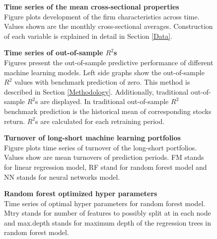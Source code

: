 \documentclass{article}
\begin{document}
\begin{figure}[ht]
\centering
\caption[Time series of the mean cross-sectional properties]{\textbf{Time series of the mean cross-sectional properties}\\ Figure plots development of the firm characteristics across time. Values shown are the monthly cross-sectional averages. Construction of each variable is explained in detail in Section \ref{Data}.}

\label{plot:variableTS}
\end{figure}

\begin{figure}[ht]
\centering
\caption[Time series of out-of-sample $R^2$]{\textbf{Time series of out-of-sample \boldmath$R^2$s}\\ Figures present the out-of-sample predictive performance of different machine learning models. Left side graphs show the out-of-sample $R^2$ values with benchmark prediction of zero. This method is described in Section \ref{Methodology}. Additionally, traditional out-of-sample $R^2$s are displayed. In traditional out-of-sample $R^2$ benchmark prediction is the historical mean of corresponding stocks return. $R^2$s are calculated for each retraining period.}

\label{plot:OOSR2_ts}
\end{figure}

\begin{figure}[ht]
\centering
\caption[Turnover of long-short machine learning portfolios]{\textbf{Turnover of long-short machine learning portfolios}\\ Figure plots time series of turnover of the long-short portfolios. Values show are mean turnovers of prediction periods. FM stands for linear regression model, RF stand for random forest model and NN stands for neural networks model. }

\label{plot:Turnover}
\end{figure}

\begin{figure}[ht]
\centering
\caption[Optimized random forest hyperparameters]{\textbf{Random forest optimized hyper parameters}\\ Time series of optimal hyper parameters for random forest model. Mtry stands for number of features to possibly split at in each node and max.depth stands for maximum depth of the regression trees in random forest model.}

\label{plot:RFHyperParams}
\end{figure}

\clearpage


\end{document}
